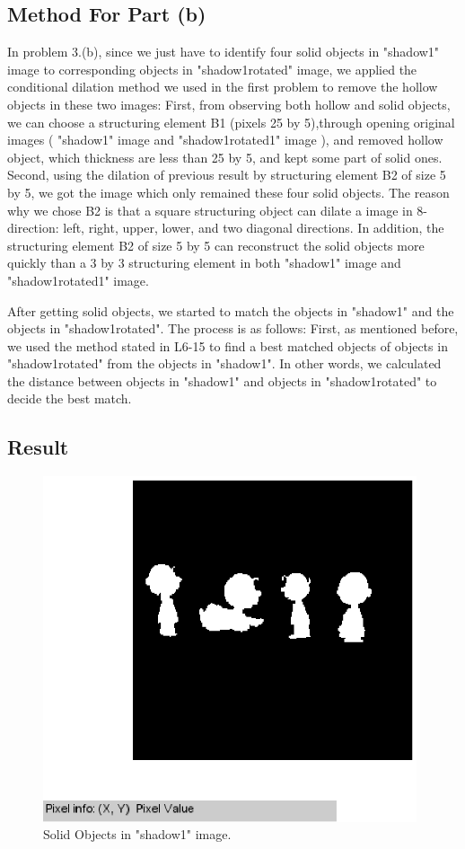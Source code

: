 \documentclass[paper=a4, fontsize=11pt]{scrartcl}
\begin{document}
\subsection{ Method For Part (b) }


In problem 3.(b), since we just have to identify four solid objects in "shadow1" image to corresponding objects in "shadow1rotated" image, we applied the conditional dilation method we used in the first problem to remove the hollow objects in these two images: 
	First, from observing both hollow and solid objects, we can choose a structuring element B1 (pixels 25 by 5),through opening original images ( "shadow1" image and "shadow1rotated1" image ), and removed hollow object, which thickness are less than 25 by 5, and kept some part of solid ones.
	Second, using the dilation of previous result by structuring element B2 of size 5 by 5, we got the image which only remained these four solid objects. The reason why we chose B2 is that a square structuring object can dilate a image in 8-direction: left, right, upper, lower, and two diagonal directions. In addition, the structuring element B2 of size 5 by 5 can reconstruct the solid objects more quickly than a 3 by 3 structuring element in both "shadow1" image and "shadow1rotated1" image.
	 
	After getting solid objects, we started to match the objects in "shadow1" and the objects in "shadow1rotated". The process is as follows: First, as mentioned before, we used the method stated in L6-15 to find a best matched objects of objects in "shadow1rotated" from the objects in "shadow1". In other words, we calculated the distance between objects in "shadow1" and objects in "shadow1rotated" to decide the best match. 
 	 
	
\subsection{ Result }

\begin{figure}
	\centering
	\includegraphics[width=11cm]{shadow1_solidpart.eps}
	\caption{Solid Objects in "shadow1" image. }
	\label{fig:23}
\end{figure}
\end{document}
